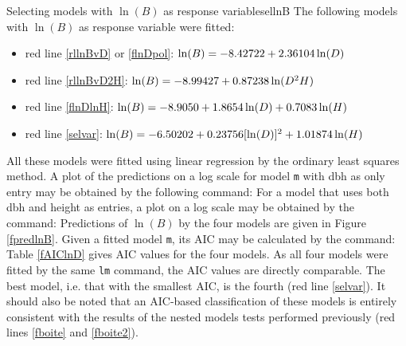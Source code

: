 \begin{filrouge}{Selecting models with $\ln(B)$ as response variable}{sellnB}%
The following models with $\ln(B)$ as response variable were fitted:
\begin{itemize}
\item red line \ref{rllnBvD} or \ref{flnDpol}: $\ln(B)=-\mbox{8.42722}+\mbox{2.36104}\ln(D)$
\item red line \ref{rllnBvD2H}: $\ln(B)=-\mbox{8.99427}+\mbox{0.87238}\ln(D^2H)$
\item red line \ref{flnDlnH}: $\ln(B)=-\mbox{8.9050}+\mbox{1.8654}\ln(D)+\mbox{0.7083}\ln(H)$
\item red line \ref{selvar}: $\ln(B)=-\mbox{6.50202}+\mbox{0.23756}[\ln(D)]^2+\mbox{1.01874}\ln(H)$
\end{itemize}
All these models were fitted using linear regression by the ordinary least squares method. A plot of the predictions on a log scale for model \texttt{m} with dbh as only entry may be obtained by the following command:
%
For a model that uses both dbh and height as entries, a plot on a log scale may be obtained by the command:
%
Predictions of $\ln(B)$ by the four models are given in  Figure \ref{fpredlnB}. Given a fitted model \texttt{m}, its AIC may be calculated by the command:
%
Table \ref{fAIClnD} gives AIC values for the four models. As all four models were fitted by the same \texttt{lm} command, the AIC values are directly comparable. The best model, i.e. that with the smallest AIC, is the fourth (red line \ref{selvar}). It should also be noted that an AIC-based classification of these models is entirely consistent with the results of the nested models tests performed previously (red lines \ref{fboite} and \ref{fboite2}).
\end{filrouge}

